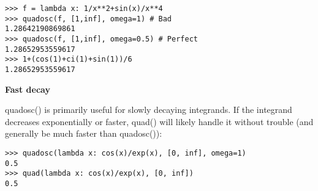 \begin{lstlisting}
>>> f = lambda x: 1/x**2+sin(x)/x**4
>>> quadosc(f, [1,inf], omega=1) # Bad
1.28642190869861
>>> quadosc(f, [1,inf], omega=0.5) # Perfect
1.28652953559617
>>> 1+(cos(1)+ci(1)+sin(1))/6
1.28652953559617
\end{lstlisting}

\vpara
\textbf{Fast decay}

quadosc() is primarily useful for slowly decaying integrands. If the integrand decreases exponentially or faster, quad() will likely handle it without trouble (and generally be much faster than quadosc()):

\begin{lstlisting}
>>> quadosc(lambda x: cos(x)/exp(x), [0, inf], omega=1)
0.5
>>> quad(lambda x: cos(x)/exp(x), [0, inf])
0.5
\end{lstlisting}


\newpage
